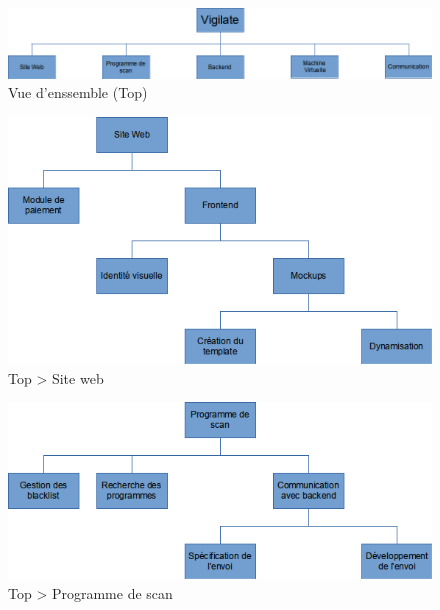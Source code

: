 \begin{figure}[H]
  \vspace*{2cm}
  \caption{Vue d'enssemble (Top)}
  \centering
  \vspace*{0.5cm}
  \includegraphics[max width=18cm]{wbs3_top.png}
\end{figure}

\begin{figure}[H]
  \vspace*{2cm}
  \caption{Top \textgreater{} Site web}
  \centering
  \vspace*{0.5cm}
  \includegraphics[max width=18cm]{wbs3_web.png}
\end{figure}

\begin{figure}[H]
  \vspace*{2cm}
  \caption{Top \textgreater{} Programme de scan}
  \centering
  \vspace*{0.5cm}
  \includegraphics[max width=18cm]{wbs3_scan_top.png}
\end{figure}

